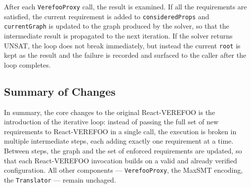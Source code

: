 
After each \texttt{VerefooProxy} call, the result is examined. If all the requirements are satisfied, the current requirement is added to \texttt{consideredProps} and \texttt{currentGraph} is updated to the graph produced by the solver, so that the intermediate result is propagated to the next iteration. If the solver returns UNSAT, the loop does not break immediately, but instead the current \texttt{root} is kept as the result and the failure is recorded and surfaced to the caller after the loop completes.






\subsection{Summary of Changes}

In summary, the core changes to the original React-VEREFOO is the introduction of the iterative loop: instead of passing the full set of new requirements to React-VEREFOO in a single call, the execution is broken in multiple intermediate steps, each adding exactly one requirement at a time. Between steps, the graph and the set of enforced requirements are updated, so that each React-VEREFOO invocation builds on a valid and already verified configuration. All other components — \texttt{VerefooProxy}, the MaxSMT encoding, the \texttt{Translator} — remain unchaged.


